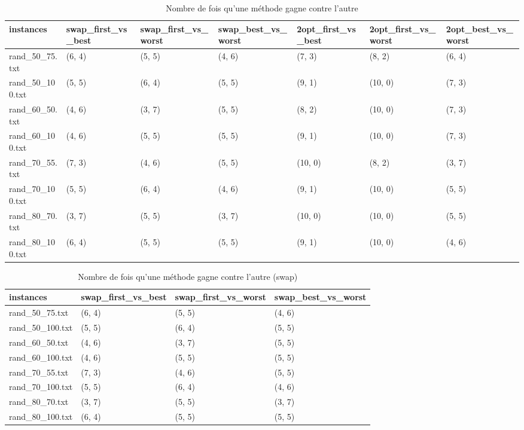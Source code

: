 \begin{table}[ht]
	\centering
	\caption{Nombre de fois qu'une méthode gagne contre l'autre}
		\begin{tabular}[t]
			{m{0.2\textwidth}m{}m{}m{} m{} m{}m{}}
			\toprule
	instances &	swap\_first\_vs\_best&	swap\_first\_vs\_worst &	swap\_best\_vs\_worst&	2opt\_first\_vs\_best&	2opt\_first\_vs\_worst&	2opt\_best\_vs\_worst\\
	\midrule
	rand\_50\_75.txt&	(6, 4)&	(5, 5)&	(4, 6)&	(7, 3)&	(8, 2)&	(6, 4)\\
	rand\_50\_100.txt&	(5, 5)&	(6, 4)&	(5, 5)&	(9, 1)&	(10, 0)&	(7, 3)\\
	rand\_60\_50.txt&	(4, 6)&	(3, 7)&	(5, 5)&	(8, 2)&	(10, 0)&	(7, 3)\\
	rand\_60\_100.txt&	(4, 6)&	(5, 5)&	(5, 5)&	(9, 1)&	(10, 0)&	(7, 3)\\
	rand\_70\_55.txt&	(7, 3)&	(4, 6)&	(5, 5)&	(10, 0)&	(8, 2)&	(3, 7)\\
	rand\_70\_100.txt&	(5, 5)&	(6, 4)&	(4, 6)&	(9, 1)&	(10, 0)&	(5, 5)\\
	rand\_80\_70.txt&	(3, 7)&	(5, 5)&	(3, 7)&	(10, 0)&	(10, 0)&	(5, 5)\\
	rand\_80\_100.txt&	(6, 4)&	(5, 5)&	(5, 5)&	(9, 1)	&(10, 0)&	(4, 6)\\
	\bottomrule
\end{tabular}
\end{table}
\fi
\begin{table}[ht]
	\rowcolors{2}{gray!10}{white}
	\centering
	\caption{Nombre de fois qu'une méthode gagne contre l'autre (swap)}
	\begin{tabular}[t]
		{m{}m{}m{}m{}}
		\toprule
		instances &	swap\_first\_vs\_best&	swap\_first\_vs\_worst &	swap\_best\_vs\_worst\\
		\midrule
		rand\_50\_75.txt&	(6, 4)&	(5, 5)&	(4, 6)\\
		rand\_50\_100.txt&	(5, 5)&	(6, 4)&	(5, 5)\\
		rand\_60\_50.txt&	(4, 6)&	(3, 7)&	(5, 5)\\
		rand\_60\_100.txt&	(4, 6)&	(5, 5)&	(5, 5)\\
		rand\_70\_55.txt&	(7, 3)&	(4, 6)&	(5, 5)\\
		rand\_70\_100.txt&	(5, 5)&	(6, 4)&	(4, 6)\\
		rand\_80\_70.txt&	(3, 7)&	(5, 5)&	(3, 7)\\
		rand\_80\_100.txt&	(6, 4)&	(5, 5)&	(5, 5)\\
		\bottomrule
	\end{tabular}
\end{table}

